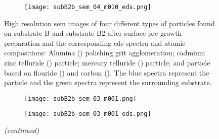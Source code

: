 \begin{figure}[htbp]
\begin{subfigure}[t]{\textwidth}
          \hfill
          \begin{minipage}[c]{0.43\linewidth}
            \centering
            \texttt{[image: subB2b\_sem\_04\_m010\_eds.png]}
          \end{minipage}
          \begin{minipage}[c]{0.11\linewidth}
            \centering
            \atomicTable[\ce{Te}&\SI{35.7}{}][\ce{Hg}&\SI{31.0}{}][\ce{C}&\SI{30.4}{}][\ce{Cd}&\SI{2.81}{}][\ce{Zn}&\SI{0.1}{}]%
          \end{minipage}
    \end{subfigure}
    \caption[\Ac{sem} images, \ac{eds} spectra, and \ac{eds} atomic compositions of four different types of particles found on substrate B and substrate B2 after surface pre-growth preparation.]{High resolution \ac{sem} images of four different types of particles found on substrate B and substrate B2 after surface pre-growth preparation and the corresponding \ac{eds} spectra and atomic compositions:  Alumina () polishing grit agglomeration;  cadmium zinc telluride () particle;  mercury telluride () particle; and  particle based on flouride () and carbon (). The blue spectra represent the particle and the green spectra represent the surrounding substrate.}\label{fig:subBb_sem_w_eds}
\end{figure}
%
\begin{figure}[htbp]
\ContinuedFloat
    \centering
    \begin{subfigure}[t]{\textwidth}
        \caption{}\label{fig:subB2b_C2F5}
          \begin{minipage}[c]{0.43\linewidth}
            \centering
            \texttt{[image: subB2b\_sem\_03\_m001.png]}
          \end{minipage}
          \hfill
          \begin{minipage}[c]{0.43\linewidth}
            \centering
            \texttt{[image: subB2b\_sem\_03\_m001\_eds.png]}
          \end{minipage}
          \begin{minipage}[c]{0.11\linewidth}
            \centering
            \atomicTable[\ce{F}&\SI{55.8}{}][\ce{C}&\SI{22.5}{}][\ce{Cd}&\SI{10.6}{}][\ce{Te}&\SI{10.4}{}][\ce{O}&\SI{0.4}{}][\ce{Zn}&\SI{0.2}{}][\ce{Si}&\SI{0.1}{}] %
          \end{minipage}
    \end{subfigure}
    \captionsetup{list=no}
    \caption{\emph{(continued)}}
\end{figure}


